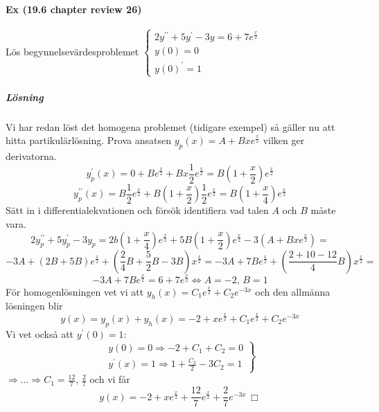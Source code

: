 \paragraph*{Ex (19.6 chapter review 26)}
Lös begynnelsevärdesproblemet $
    \left\lbrace
    \begin{matrix}
        2y^{\prime\prime}+5y^\prime-3y=6+7e^{\frac{x}{2}} \\
        y(0)=0                                            \\
        y(0)^\prime=1
    \end{matrix}
    \right.$
\subparagraph*{Lösning}
Vi har redan löst det homogena problemet (tidigare exempel) så gäller nu att hitta partikulärlösning.
Prova ansatsen $y_p(x)=A+Bxe^\frac{x}{2}$ vilken ger derivatorna.
\begin{equation*}
    y_p^\prime(x)=0+Be^\frac{x}{2}+Bx\frac{1}{2}e^\frac{x}{2}=B(1+\frac{x}{2})e^\frac{x}{2}
\end{equation*}
\begin{equation*}
    y^{\prime\prime}_p(x)=B\frac{1}{2}e^\frac{x}{2}+B(1+\frac{x}{2})\frac{1}{2}e^\frac{x}{2}=B(1+\frac{x}{4})e^\frac{x}{2}
\end{equation*}
Sätt in i differentialekvationen och försök identifiera vad talen $A$ och $B$ måste vara.
\begin{equation*}
    2y_p^{\prime\prime}+5y^\prime_p-3y_p=
    2b(1+\frac{x}{4})e^{\frac{x}{2}}+5B(1+\frac{x}{2})e^\frac{x}{2}-3(A+Bxe^\frac{x}{2})=
\end{equation*}
\begin{equation*}
    -3A+(2B+5B)e^\frac{x}{2}+(\frac{2}{4}B+\frac{5}{2}B-3B)x^\frac{x}{2}=
    -3A+7Be^\frac{x}{2}+(\frac{2+10-12}{4}B)x^\frac{x}{2}=
\end{equation*}
\begin{equation*}
    -3A+7Be^\frac{x}{2}=
    6+7e^\frac{x}{2}\Leftrightarrow
    A=-2,\, B=1
\end{equation*}
För homogenlösningen vet vi att $y_h(x)=C_1e^\frac{x}{2}+C_2e^{-3x}$ och den allmänna lösningen blir
\begin{equation*}
    y(x)=
    y_p(x)+y_h(x)=
    -2+xe^\frac{x}{2}+C_1e^\frac{x}{2}+C_2e^{-3x}
\end{equation*}
Vi vet också att $y^\prime(0)=1$:
\begin{equation*}
    \left.
    \begin{matrix}
        y(0)=0\Rightarrow-2+C_1+C_2=0 \\
        y^\prime(x)=1\Rightarrow 1+\frac{C_2}{2}-3C_2=1
    \end{matrix}
    \right\rbrace
\end{equation*}
$\Rightarrow...\Rightarrow C_1=\frac{12}{7},\, \frac{2}{7}$ och vi får
\begin{equation*}
    y(x)=-2+xe^\frac{x}{2}+\frac{12}{7}e^\frac{x}{2}+\frac{2}{7}e^{-3x}\, \Box
\end{equation*}